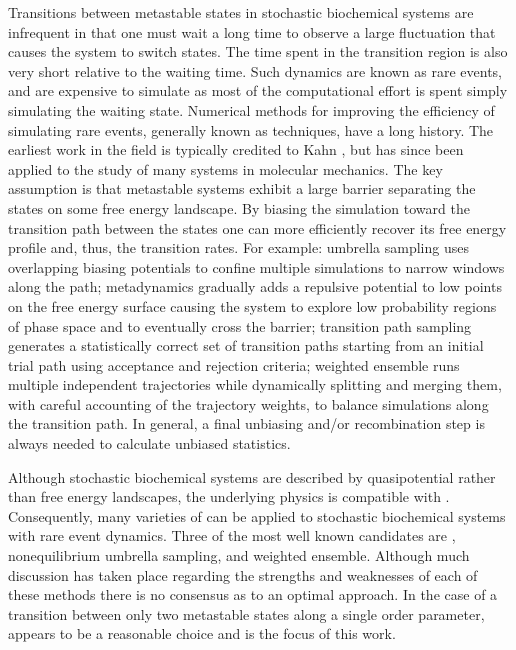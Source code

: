Transitions between metastable states in stochastic biochemical systems are infrequent in that one must wait a long time to observe a large fluctuation that causes the system to switch states\supercite{Baron:2017tf}. The time spent in the transition region is also very short relative to the waiting time\supercite{Becker:2012ej}. Such dynamics are known as rare events, and are expensive to simulate as most of the computational effort is spent simply simulating the waiting state. Numerical methods for improving the efficiency of simulating rare events, generally known as  techniques, have a long history. The earliest work in the field is typically credited to Kahn \etal{}\supercite{Kahn:1951es}, but has since been applied to the study of many systems in molecular mechanics. The key assumption is that metastable systems exhibit a large barrier separating the states on some free energy landscape. By biasing the simulation toward the transition path between the states one can more efficiently recover its free energy profile and, thus, the transition rates. For example: umbrella sampling\supercite{Torrie:1977hs,Souaille:2001gm} uses overlapping biasing potentials to confine multiple simulations to narrow windows along the path; metadynamics\supercite{Laio:2002ft,Dama:2014ef} gradually adds a repulsive potential to low points on the free energy surface causing the system to explore low probability regions of phase space and to eventually cross the barrier; transition path sampling\supercite{Dellago:1998kw,Crooks:2001cf,Jung:2017jj} generates a statistically correct set of transition paths starting from an initial trial path using acceptance and rejection criteria; weighted ensemble\supercite{Huber:1996dna,Zuckerman:2017eq} runs multiple independent trajectories while dynamically splitting and merging them, with careful accounting of the trajectory weights, to balance simulations along the transition path. In general, a final unbiasing and/or recombination step is always needed to calculate unbiased statistics.

Although stochastic biochemical systems are described by quasipotential rather than free energy landscapes, the underlying physics is compatible with . Consequently, many varieties of  can be applied to stochastic biochemical systems with rare event dynamics. Three of the most well known candidates are  \supercite{Allen:2005wy,Allen:2006cp,Valeriani:2007hv,Allen:2009kb}, nonequilibrium umbrella sampling\supercite{Warmflash:2007dz,Dickson:2009gt,Dickson:2009fua}, and weighted ensemble\supercite{Zhang:2010kfa,Bhatt:2010df,Adelman:2013ii,Donovan:2013gz,Donovan:2016bi}. Although much discussion has taken place regarding the strengths and weaknesses of each of these methods\supercite{Dickson:2010gf,Escobedo:2009dya} there is no consensus as to an optimal approach. In the case of a transition between only two metastable states along a single order parameter,  appears to be a reasonable choice and is the focus of this work.

